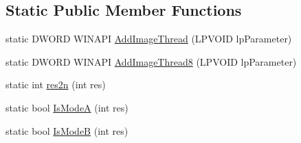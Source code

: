 \subsection*{Static Public Member Functions}
\begin{DoxyCompactItemize}
\item 
static D\+W\+O\+R\+D W\+I\+N\+A\+P\+I \hyperlink{class_c_v_i_engine_base_ad9c65ff1caec8b5042fd55628c515373}{Add\+Image\+Thread} (L\+P\+V\+O\+I\+D lp\+Parameter)
\item 
static D\+W\+O\+R\+D W\+I\+N\+A\+P\+I \hyperlink{class_c_v_i_engine_base_acb273d8d1df0ad615bec58b0a9c5f1cc}{Add\+Image\+Thread8} (L\+P\+V\+O\+I\+D lp\+Parameter)
\item 
static int \hyperlink{class_c_v_i_engine_base_a96058275b74d792351596a389ee29bbd}{res2n} (int res)
\item 
static bool \hyperlink{class_c_v_i_engine_base_a2f8fba45abd4bb564101fb090de26a48}{Is\+Mode\+A} (int res)
\item 
static bool \hyperlink{class_c_v_i_engine_base_a7029194ddd71a7322746e962a3ed5b46}{Is\+Mode\+B} (int res)
\end{DoxyCompactItemize}
